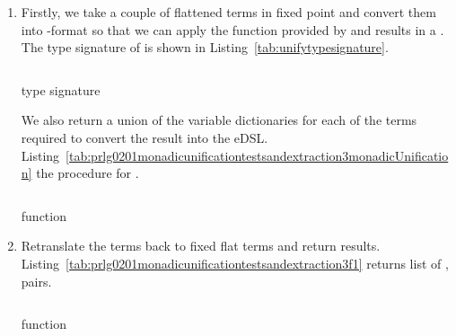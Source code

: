 \documentclass[thesis-solanki.tex]{subfiles}
\begin{document}
\begin{enumerate}
\item{}

  Firstly, we take a couple of flattened terms in fixed point and convert them into -format
so that we can apply the  function provided by  and results
in a . The type signature of  is shown in Listing~\ref{tab:unifytypesignature}.

\begin{code-list}[H]
\begin{singlespace}
\inputminted[linenos]{haskell}{haskell-proto2-unify-type-signature.hs}
\end{singlespace}
\caption{  type signature}
\label{tab:unifytypesignature}
\end{code-list}


We also return a union of the variable dictionaries for each of the terms required to convert the result into the eDSL.
Listing~\ref{tab:prlg0201monadicunificationtestsandextraction3monadicUnification} the procedure for 
.


\begin{code-list}[H]
  \begin{singlespace}
    \inputminted[linenos,firstline=84, lastline=93]{haskell}{haskell-proto2-monadic-unification-tests-and-extraction.hs}
  \end{singlespace}
\caption{ function}
\label{tab:prlg0201monadicunificationtestsandextraction3monadicUnification}
\end{code-list}

\item{}

Retranslate the terms back to fixed flat terms and return results.
Listing~\ref{tab:prlg0201monadicunificationtestsandextraction3f1}
returns list of ,  pairs.

\begin{code-list}[H]
  \begin{singlespace}
    \inputminted[linenos,firstline=109, lastline=119]{haskell}{haskell-proto2-monadic-unification-tests-and-extraction.hs}
  \end{singlespace}
\caption{ function}
\label{tab:prlg0201monadicunificationtestsandextraction3f1}
\end{code-list}



\end{enumerate}
\end{document}
